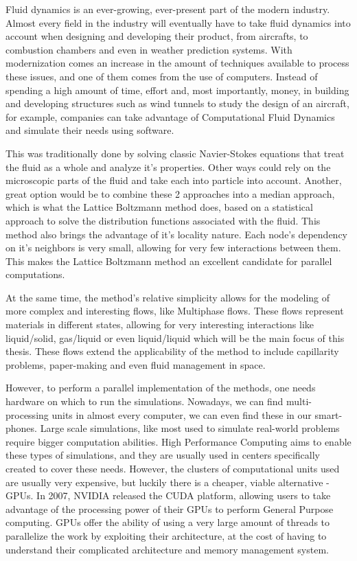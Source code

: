 \documentclass[12pt]{book}
\begin{document}
Fluid dynamics is an ever-growing, ever-present part of the modern industry. Almost every field in the industry will eventually have to take fluid dynamics into account when designing and developing their product, from aircrafts, to combustion chambers and even in weather prediction systems. With modernization comes an increase in the amount of techniques available to process these issues, and one of them comes from the use of computers. Instead of spending a high amount of time, effort and, most importantly, money, in building and developing structures such as wind tunnels to study the design of an aircraft, for example, companies can take advantage of Computational Fluid Dynamics and simulate their needs using software. \par
This was traditionally done by solving classic Navier-Stokes equations that treat the fluid as a whole and analyze it's properties. Other ways could rely on the microscopic parts of the fluid and take each into particle into account. Another, great option would be to combine these 2 approaches into a median approach, which is what the Lattice Boltzmann method does, based on a statistical approach to solve the distribution functions associated with the fluid. This method also brings the advantage of it's locality nature. Each node's dependency on it's neighbors is very small, allowing for very few interactions between them. This makes the Lattice Boltzmann method an excellent candidate for parallel computations.\par
At the same time, the method's relative simplicity allows for the modeling of more complex and interesting flows, like Multiphase flows. These flows represent materials in different states, allowing for very interesting interactions like liquid/solid, gas/liquid or even liquid/liquid which will be the main focus of this thesis. These flows extend the applicability of the method to include capillarity problems, paper-making and even fluid management in space. \par
However, to perform a parallel implementation of the methods, one needs hardware on which to run the simulations. Nowadays, we can find multi-processing units in almost every computer, we can even find these in our smart-phones. Large scale simulations, like most used to simulate real-world problems require bigger computation abilities. High Performance Computing aims to enable these types of simulations, and they are usually used in centers specifically created to cover these needs. However, the clusters of computational units used are usually very expensive, but luckily there is a cheaper, viable alternative - GPUs. In 2007, NVIDIA released the CUDA platform, allowing users to take advantage of the processing power of their GPUs to perform General Purpose computing. GPUs offer the ability of using a very large amount of threads to parallelize the work by exploiting their architecture, at the cost of having to understand their complicated architecture and memory management system. \par
\end{document}
